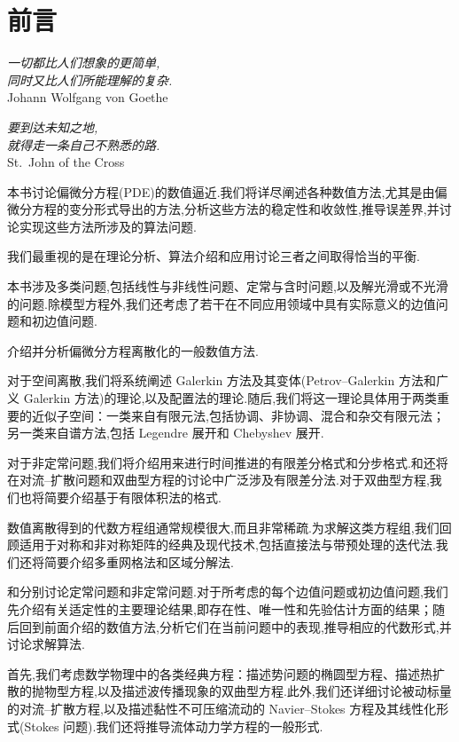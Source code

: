 \chapter*{前言}
\begin{flushright}
\textit{一切都比人们想象的更简单,}\\
\textit{同时又比人们所能理解的复杂.}\\
Johann Wolfgang von Goethe\par\medskip
\textit{要到达未知之地,}\\
\textit{就得走一条自己不熟悉的路.}\\
St.~John of the Cross
\end{flushright}

本书讨论偏微分方程(PDE)的数值逼近.我们将详尽阐述各种数值方法,尤其是由偏微分方程的变分形式导出的方法,分析这些方法的稳定性和收敛性,推导误差界,并讨论实现这些方法所涉及的算法问题.

我们最重视的是在理论分析、算法介绍和应用讨论三者之间取得恰当的平衡.

本书涉及多类问题,包括线性与非线性问题、定常与含时问题,以及解光滑或不光滑的问题.除模型方程外,我们还考虑了若干在不同应用领域中具有实际意义的边值问题和初边值问题.

介绍并分析偏微分方程离散化的一般数值方法.

对于空间离散,我们将系统阐述 Galerkin 方法及其变体(Petrov--Galerkin 方法和广义 Galerkin 方法)的理论,以及配置法的理论.随后,我们将这一理论具体用于两类重要的近似子空间：一类来自有限元法,包括协调、非协调、混合和杂交有限元法；另一类来自谱方法,包括 Legendre 展开和 Chebyshev 展开.

对于非定常问题,我们将介绍用来进行时间推进的有限差分格式和分步格式.和还将在对流--扩散问题和双曲型方程的讨论中广泛涉及有限差分法.对于双曲型方程,我们也将简要介绍基于有限体积法的格式.

数值离散得到的代数方程组通常规模很大,而且非常稀疏.为求解这类方程组,我们回顾适用于对称和非对称矩阵的经典及现代技术,包括直接法与带预处理的迭代法.我们还将简要介绍多重网格法和区域分解法.

和分别讨论定常问题和非定常问题.对于所考虑的每个边值问题或初边值问题,我们先介绍有关适定性的主要理论结果,即存在性、唯一性和先验估计方面的结果；随后回到前面介绍的数值方法,分析它们在当前问题中的表现,推导相应的代数形式,并讨论求解算法.

首先,我们考虑数学物理中的各类经典方程：描述势问题的椭圆型方程、描述热扩散的抛物型方程,以及描述波传播现象的双曲型方程.此外,我们还详细讨论被动标量的对流--扩散方程,以及描述黏性不可压缩流动的 Navier--Stokes 方程及其线性化形式(Stokes 问题).我们还将推导流体动力学方程的一般形式.

